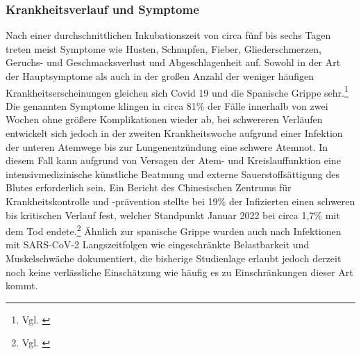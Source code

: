\documentclass[12pt]{article}
\begin{document}
\subsubsection{Krankheitsverlauf und Symptome} \label{subsec:Cov-Verlauf}
 Nach einer durchschnittlichen Inkubationszeit von circa fünf bis sechs Tagen treten meist Symptome wie Husten, Schnupfen, Fieber, Gliederschmerzen, Geruchs- und Geschmacksverlust und Abgeschlagenheit auf. Sowohl in der Art der Hauptsymptome als auch in der großen Anzahl der weniger häufigen Krankheitserscheinungen gleichen sich Covid 19 und die Spanische Grippe sehr.\footnote{Vgl. \cite{Gov21}} Die genannten Symptome klingen in circa 81\% der Fälle innerhalb von zwei Wochen ohne größere Komplikationen wieder ab, bei schwereren Verläufen entwickelt sich jedoch in der zweiten Krankheitswoche aufgrund einer Infektion der unteren Atemwege bis zur Lungenentzündung eine schwere Atemnot. In diesem Fall kann aufgrund von Versagen der Atem- und Kreislauffunktion eine intensivmedizinische künstliche Beatmung und externe Sauerstoffsättigung des Blutes erforderlich sein. Ein Bericht des Chinesischen Zentrums für Krankheitskontrolle und -prävention stellte bei 19\% der Infizierten einen schweren bis kritischen Verlauf fest, welcher Standpunkt Januar 2022 bei circa 1,7\% mit dem Tod endete.\footnote{Vgl. \cite{Cov22}} Ähnlich zur spanische Grippe wurden auch nach Infektionen mit SARS-CoV-2 Langszeitfolgen wie eingeschränkte Belastbarkeit und Muskelschwäche dokumentiert, die bisherige Studienlage erlaubt jedoch derzeit noch keine verlässliche Einschätzung wie häufig es zu Einschränkungen dieser Art kommt.
\end{document}

